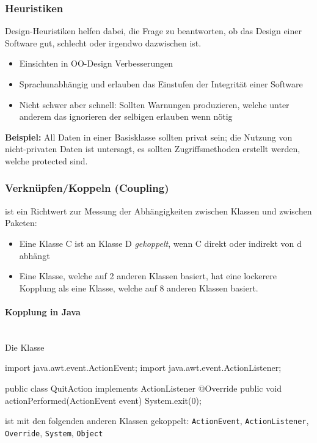 \documentclass[
    ngerman,
    color=3b,
    summary,
    boxarc,
    main,
]{rubos-tuda-template}
\begin{document}
\subsubsection{Heuristiken}
Design-Heuristiken helfen dabei, die Frage zu beantworten, ob das Design einer Software gut, schlecht oder irgendwo dazwischen ist.
\begin{itemize}
    \item Einsichten in OO-Design Verbesserungen
    \item Sprachunabhängig und erlauben das Einstufen der Integrität einer Software
    \item Nicht schwer aber schnell: Sollten Warnungen produzieren, welche unter anderem das ignorieren der selbigen erlauben wenn nötig
\end{itemize}

\textbf{Beispiel:} All Daten in einer Basisklasse sollten privat sein; die Nutzung von nicht-privaten Daten ist untersagt, es sollten Zugriffsmethoden erstellt werden, welche protected sind.
\clearpage
\subsubsection{Verknüpfen/Koppeln (Coupling)}

\begin{definition}
    ist ein Richtwert zur Messung der Abhängigkeiten zwischen Klassen und zwischen Paketen:
    \begin{itemize}
        \item  Eine Klasse C ist an Klasse D \textit{gekoppelt}, wenn C direkt oder indirekt von d abhängt
        \item  Eine Klasse, welche auf 2 anderen Klassen basiert, hat eine lockerere Kopplung als eine Klasse, welche auf 8 anderen Klassen basiert.
    \end{itemize}
\end{definition}

\paragraph{Kopplung in Java}\mbox{}\\
Die Klasse
\begin{codeBlock}[autogobble]{}
    import java.awt.event.ActionEvent;
    import java.awt.event.ActionListener;

    public class QuitAction implements ActionListener {
    	@Override
    	public void actionPerformed(ActionEvent event) {
    		System.exit(0);
    	}
    }
\end{codeBlock}
ist mit den folgenden anderen Klassen gekoppelt: \texttt{ActionEvent}, \texttt{ActionListener}, \texttt{Override}, \texttt{System}, \texttt{Object}
\end{document}
